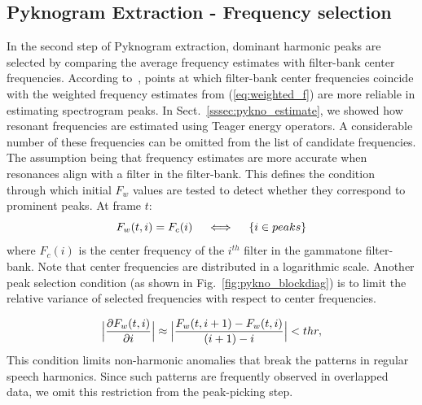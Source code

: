{\subsection{Pyknogram Extraction - Frequency selection}
\label{sssec:pykno_select}
In the second step of Pyknogram extraction, dominant harmonic peaks are selected by comparing the average frequency estimates with filter-bank center frequencies. 
According to~\cite{potamianos_maragos_jasa96}, points at which filter-bank center frequencies coincide with the weighted frequency estimates from (\ref{eq:weighted_f}) are more reliable in estimating spectrogram peaks. 
In Sect.~\ref{sssec:pykno_estimate}, we showed how resonant frequencies are estimated using Teager energy operators. 
A considerable number of these frequencies can be omitted from the list of candidate frequencies. 
The assumption being that frequency estimates are more accurate when resonances align with a filter in the filter-bank. 
This defines the condition through which initial $F_w$ values are tested to detect whether they correspond to prominent peaks. At frame $t$: 
\vspace{0mm}
\begin{equation}
\label{eq:RF1}
F_w(t,i) = F_c(i)  \quad \iff \quad \{i \in peaks\}
\vspace{1mm}
\end{equation}
where $F_c(i)$ is the center frequency of the $i^{th}$ filter in the gammatone filter-bank. 
Note that center frequencies are distributed in a logarithmic scale. 
Another peak selection condition (as shown in Fig.~\ref{fig:pykno_blockdiag}) is to limit the relative variance of selected frequencies with respect to center frequencies. 

\begin{equation}
\label{eq:RF2}
\Big|\frac{\partial F_w(t,i)}{\partial i} \Big| \approx \Big|\frac{F_w(t,i+1) - F_w(t,i)}{(i+1) - i}\Big| < thr, 
\vspace{1mm}
\end{equation}
This condition limits non-harmonic anomalies that break the patterns in regular speech harmonics. 
Since such patterns are frequently observed in overlapped data, we omit this restriction from the peak-picking step.  

}
